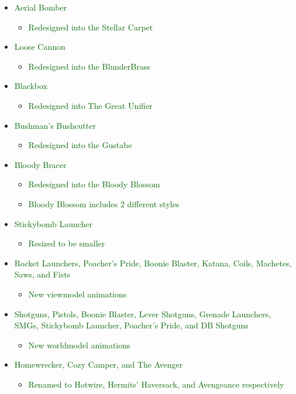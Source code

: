 \documentclass{article}
\begin{document}
\begin{itemize}
    \item \textcolor{darkgreen}{Aerial Bomber}
    \begin{itemize}
        \item \textcolor{darkgreen}{Redesigned into the Stellar Carpet}
    \end{itemize}
    \item \textcolor{darkgreen}{Loose Cannon}
    \begin{itemize}
        \item \textcolor{darkgreen}{Redesigned into the BlunderBrass}
    \end{itemize}
    \item \textcolor{darkgreen}{Blackbox}
    \begin{itemize}
        \item \textcolor{darkgreen}{Redesigned into The Great Unifier}
    \end{itemize}
    \item \textcolor{darkgreen}{Bushman’s Bushcutter}
    \begin{itemize}
        \item \textcolor{darkgreen}{Redesigned into the Gustabe}
    \end{itemize}
    \item \textcolor{darkgreen}{Bloody Bracer}
    \begin{itemize}
        \item \textcolor{darkgreen}{Redesigned into the Bloody Blossom}
        \item \textcolor{darkgreen}{Bloody Blossom includes 2 different styles}
    \end{itemize}
    \item \textcolor{darkgreen}{Stickybomb Launcher}
    \begin{itemize}
        \item \textcolor{darkgreen}{Resized to be smaller}
    \end{itemize}
    \item \textcolor{darkgreen}{Rocket Launchers, Poacher’s Pride, Boonie Blaster, Katana, Coils, Machetes, Saws, and Fists}
    \begin{itemize}
        \item \textcolor{darkgreen}{New viewmodel animations}
    \end{itemize}
    \item \textcolor{darkgreen}{Shotguns, Pistols, Boonie Blaster, Lever Shotguns, Grenade Launchers, SMGs, Stickybomb Launcher, Poacher’s Pride, and DB Shotguns}
    \begin{itemize}
        \item \textcolor{darkgreen}{New worldmodel animations}
    \end{itemize}
    \item \textcolor{darkgreen}{Homewrecker, Cozy Camper, and The Avenger}
    \begin{itemize}
        \item \textcolor{darkgreen}{Renamed to Hotwire, Hermits’ Haversack, and Avengeance respectively}
    \end{itemize}
\end{itemize}
\end{document}
